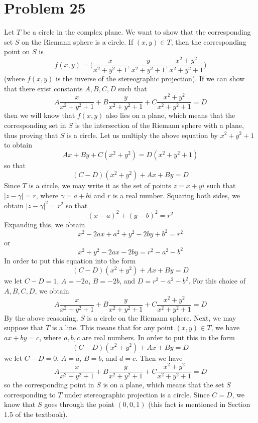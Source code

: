 \documentclass[12pt]{article}
\begin{document}
\section*{Problem 25}
Let $T$ be a circle in the complex plane. We want to show that the corresponding set $S$ on the Riemann sphere is a circle. If $(x,y) \in T$, then the corresponding point on $S$ is 
\[
f(x,y) = \bigg(\frac{x}{x^2+y^2+1}, \frac{y}{x^2+y^2+1}, \frac{x^2+y^2}{x^2+y^2+1}\bigg)
\] (where $f(x,y)$ is the inverse of the stereographic projection). If we can show that there exist constants $A,B,C,D$ such that
\[
A\frac{x}{x^2+y^2+1} + B\frac{y}{x^2+y^2+1} + C\frac{x^2+y^2}{x^2+y^2+1} =D
\] then we will know that $f(x,y)$ also lies on a plane, which means that the corresponding set in $S$ is the intersection of the Riemann sphere with a plane, thus proving that $S$ is a circle. Let us multiply the above equation by $x^2+y^2+1$ to obtain
\[
Ax + By + C(x^2+y^2) = D(x^2+y^2+1)
\] so that
\[
(C-D)(x^2+y^2) + Ax + By = D
\] Since $T$ is a circle, we may write it as the set of points $z=x+yi$ such that $\vert z - \gamma \vert = r$, where $\gamma = a+bi$ and $r$ is a real number. Squaring both sides, we obtain $\vert z - \gamma \vert^2 = r^2$ so that
\[
(x-a)^2 + (y-b)^2 = r^2
\] Expanding this, we obtain
\[
x^2 - 2ax + a^2 + y^2 - 2by + b^2 = r^2
\] or
\[
x^2+y^2 -2ax - 2by = r^2 - a^2 - b^2
\] In order to put this equation into the form
\[
(C-D)(x^2+y^2) + Ax + By = D
\] we let $C-D = 1$, $A = -2a$, $B = -2b$, and $D= r^2 - a^2 - b^2$. For this choice of $A,B,C,D$, we obtain
\[
A\frac{x}{x^2+y^2+1} + B\frac{y}{x^2+y^2+1} + C\frac{x^2+y^2}{x^2+y^2+1} =D
\] By the above reasoning, $S$ is a circle on the Riemann sphere. Next, we may suppose that $T$ is a line. This means that for any point $(x,y) \in T$, we have $ax+by = c$, where $a,b,c$ are real numbers. In order to put this in the form
\[
(C-D)(x^2+y^2) + Ax + By = D
\] we let $C-D = 0$, $A = a$, $B = b$, and $d = c$. Then we have
\[
A\frac{x}{x^2+y^2+1} + B\frac{y}{x^2+y^2+1} + C\frac{x^2+y^2}{x^2+y^2+1} = D
\] so the corresponding point in $S$ is on a plane, which means that the set $S$ corresponding to $T$ under stereographic projection is a circle. Since $C = D$, we know that $S$ goes through the point $(0,0,1)$ (this fact is mentioned in Section $1.5$ of the textbook).
\newpage
\end{document}
